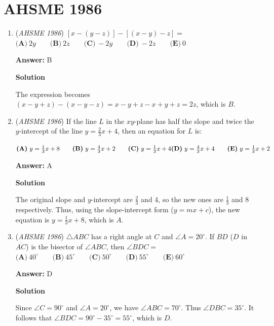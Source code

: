 \section{AHSME 1986}
        \begin{enumerate}
        	\item (\textit{AHSME 1986}) $[x-(y-z)] - [(x-y) - z] =$
$\textbf{(A)}\ 2y \qquad \textbf{(B)}\ 2z \qquad \textbf{(C)}\ -2y \qquad \textbf{(D)}\ -2z \qquad \textbf{(E)}\ 0$

 \textbf{Answer: }B



\textbf{Solution}

The expression becomes $(x-y+z)-(x-y-z) = x-y+z-x+y+z = 2z$, which is $\boxed{B}$.

 


	\item (\textit{AHSME 1986}) If the line $L$ in the $xy$-plane has half the slope and twice the $y$-intercept of the line $y = \frac{2}{3} x + 4$, then an equation for $L$ is:


 $\textbf{(A)}\ y = \frac{1}{3} x + 8 \qquad \textbf{(B)}\ y = \frac{4}{3} x + 2 \qquad \textbf{(C)}\ y =\frac{1}{3}x+4\qquad\\  \textbf{(D)}\ y =\frac{4}{3}x+4\qquad \textbf{(E)}\ y =\frac{1}{3}x+2$

 \textbf{Answer: }A



\textbf{Solution}

The original slope and $y$-intercept are $\frac{2}{3}$ and $4$, so the new ones are $\frac{1}{3}$ and $8$ respectively. Thus, using the slope-intercept form ($y = mx+c$), the new equation is $y=\frac{1}{3}x + 8$, which is $\boxed{A}$.

 


	\item (\textit{AHSME 1986}) $\triangle ABC$ has a right angle at $C$ and $\angle A = 20^\circ$. If $BD$ ($D$ in $\overline{AC}$) is the bisector of $\angle ABC$, then $\angle BDC =$
$\textbf{(A)}\ 40^\circ \qquad \textbf{(B)}\ 45^\circ \qquad \textbf{(C)}\ 50^\circ \qquad \textbf{(D)}\ 55^\circ\qquad \textbf{(E)}\ 60^\circ$

 \textbf{Answer: }D



\textbf{Solution}

Since $\angle C = 90^{\circ}$ and $\angle A = 20^{\circ}$, we have $\angle ABC = 70^{\circ}$. Thus $\angle DBC = 35^{\circ}$. It follows that $\angle BDC = 90^{\circ} - 35^{\circ} = 55^{\circ}$, which is $\boxed{D}$.


\end{enumerate}
